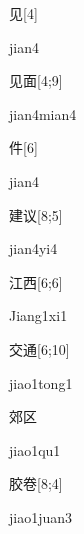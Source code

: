 \begin{verbete}[jian4]{见}[4]
\begin{pronuncia}{jian4}
\end{pronuncia}
\end{verbete}

\begin{verbete}{见面}[4;9]
\begin{pronuncia}{jian4mian4}
\end{pronuncia}
\end{verbete}

\begin{verbete}[jian4]{件}[6]
\begin{pronuncia}{jian4}
\end{pronuncia}
\end{verbete}

\begin{verbete}[jian4yi4]{建议}[8;5]
\begin{pronuncia}{jian4yi4}
\end{pronuncia}
\end{verbete}

\begin{verbete}[Jiang1xi1]{江西}[6;6]
\begin{pronuncia}{Jiang1xi1}
\end{pronuncia}
\end{verbete}

\begin{verbete}{交通}[6;10]
\begin{pronuncia}{jiao1tong1}
\end{pronuncia}
\end{verbete}

\begin{verbete}[jiao1qu1]{郊区}
\begin{pronuncia}{jiao1qu1}
\end{pronuncia}
\end{verbete}

\begin{verbete}{胶卷}[8;4]
\begin{pronuncia}{jiao1juan3}
\end{pronuncia}
\end{verbete}

